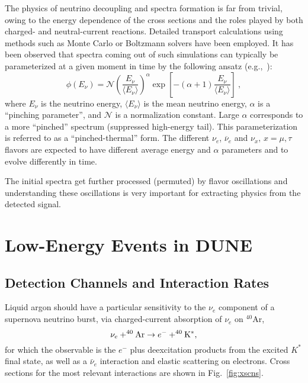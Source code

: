 The physics of neutrino decoupling and spectra formation is far from trivial, owing to the energy dependence of the cross sections and the roles played by both charged- and neutral-current reactions.
Detailed transport calculations using methods such as Monte Carlo or Boltzmann solvers have been employed. It has been observed that spectra coming out of such simulations can typically be parameterized at a given moment in time by the following ansatz (e.g.,~\cite{Minakata:2008nc,Tamborra:2012ac}):
\begin{equation}
        \label{eq:pinched}
        \phi(E_{\nu}) = \mathcal{N} 
        \left(\frac{E_{\nu}}{\langle E_{\nu} \rangle}\right)^{\alpha} \exp\left[-\left(\alpha + 1\right)\frac{E_{\nu}}{\langle E_{\nu} \rangle}\right] \ ,
\end{equation}
where $E_{\nu}$ is the neutrino energy, $\langle E_\nu \rangle$ is the
mean neutrino energy, $\alpha$ is a ``pinching parameter'', and
$\mathcal{N}$ is a normalization constant.
%
Large $\alpha$ corresponds to a more ``pinched'' spectrum (suppressed
high-energy tail). This parameterization is referred to as a
``pinched-thermal'' form. The different $\nu_e$, $\overline{\nu}_e$ and
$\nu_x, \, x = \mu, \tau$ flavors are expected to have different
average energy and $\alpha$ parameters and to evolve differently in
time. 

The initial spectra get further processed (permuted) by flavor oscillations and understanding these oscillations is very important for extracting physics from the detected signal.


\section{Low-Energy Events in DUNE}\label{sec:lowe-events}

\subsection{Detection Channels and Interaction Rates}

Liquid argon should have a particular sensitivity to the $\nu_e$
component of a supernova neutrino burst, via charged-current
absorption of $\nu_e$ on $^{40}$Ar,
\begin{equation}
\nu_e + ^{40}{\rm Ar} \rightarrow e^- + ^{40}{\rm K^*},
\label{eq:nueabs}
\end{equation}
for which the observable is the $e^-$ plus deexcitation products from the excited $K^*$ final state, as well as a $\bar{\nu}_e$ interaction and elastic scattering on electrons.
Cross sections for the most
relevant interactions are shown in Fig.~\ref{fig:xscns}.

